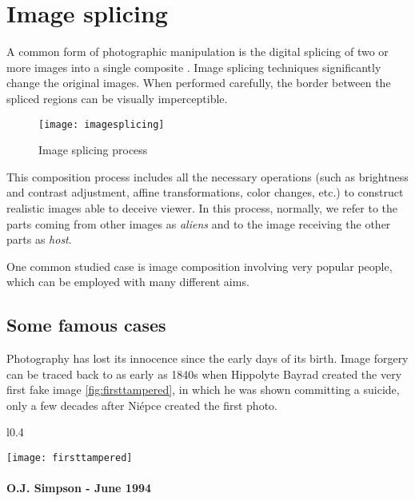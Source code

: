 \section{Image splicing}

A common form of photographic manipulation is the digital splicing of two or more images into a single composite \cite{qazi2013survey}. Image splicing techniques significantly change the original images. When
performed carefully, the border between the spliced regions can
be visually imperceptible. 

\begin{figure}
  \centering
    \texttt{[image: imagesplicing]}
    \caption{Image splicing process}
\end{figure}

This composition process includes all the necessary operations (such as brightness and contrast adjustment, affine transformations, color changes, etc.) to construct realistic images able to deceive viewer. In this process, normally, we refer to the parts coming from other images as \emph{aliens} and to the image receiving the other parts as \emph{host}.

One common studied case is image composition involving very popular people, which can be employed with many different aims.

\subsection{Some famous cases}

Photography has lost its innocence since the early days of its birth. Image forgery can be traced back to as early as 1840s when Hippolyte Bayrad created the very first fake image \ref{fig:firsttampered}, in which he was shown committing a suicide, only a few decades after Niépce created the first photo.

\begin{wrapfigure}{l}{0.4\textwidth}
  \begin{center}
    \texttt{[image: firsttampered]}
  \end{center}
  \label{fig:firsttampered}
  \caption{The first tampered image}
\end{wrapfigure}

\paragraph{O.J. Simpson - June 1994}

